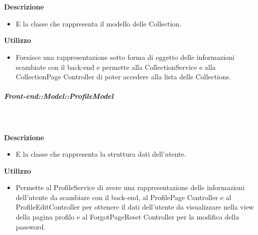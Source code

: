         \textbf{\\ \\ Descrizione} 
          \begin{itemize}
            \item[] E la classe che rappresenta il modello delle Collection.
          \end{itemize}      
        \textbf{Utilizzo}  
          \begin{itemize}
            \item[] Fornisce una rappresentazione sotto forma di oggetto delle informazioni scambiate con il back-end e permette alla CollectionService e alla CollectionPage Controller di poter accedere alla lista delle Collections.
          \end{itemize}
      \subparagraph{Front-end::Model::ProfileModel}
        
        \textbf{\\ \\ Descrizione} 
          \begin{itemize}
            \item[] E la classe che rappresenta la struttura dati dell'utente.
          \end{itemize}      
        \textbf{Utilizzo}  
          \begin{itemize}
            \item[] Permette al ProfileService di avere una rappresentazione delle informazioni dell'utente da scambiare con il back-end, al ProfilePage Controller e al ProfileEditController per ottenere il dati dell'utente da visualizzare nella view della pagina profilo e al ForgotPageReset Controller per la modifica della password.
          \end{itemize}
